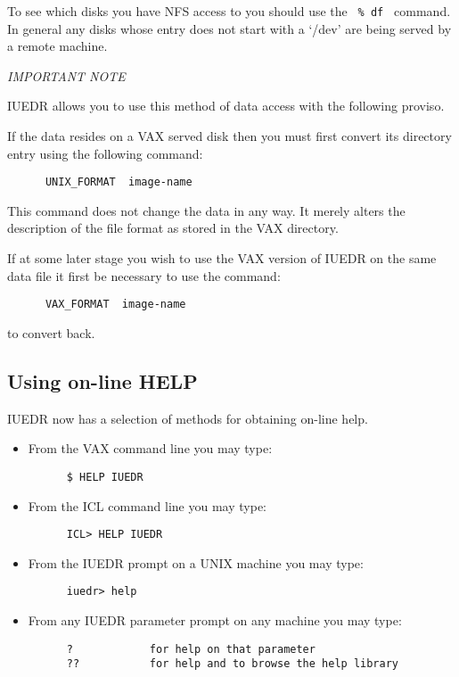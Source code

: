 To see which disks you have NFS access to you should use the {\tt
\%~df } command. In general any disks whose entry does not start with
a `/dev' are being served by a remote machine.


{\em IMPORTANT NOTE}

IUEDR allows you to use this method of data access with the following
proviso.

If the data resides on a VAX served disk then you must first  convert
its directory entry using the following command:

\begin{verbatim}
      UNIX_FORMAT  image-name
\end{verbatim}

This command does not change the data in any way. It merely alters the
description of the file format as stored in the VAX directory.

If at some later stage you wish to use the VAX version of IUEDR on the
same data file it first be necessary to use the command:

\begin{verbatim}
      VAX_FORMAT  image-name
\end{verbatim}

to convert back.
	
\subsection{Using on-line HELP}

IUEDR now has a selection of methods for obtaining on-line help.

\begin{itemize}
\item
From the VAX command line you may type:

\begin{verbatim}
      $ HELP IUEDR
\end{verbatim}
\item
From the ICL command line you may type:

\begin{verbatim}
      ICL> HELP IUEDR
\end{verbatim}

\item
From the IUEDR prompt on a UNIX machine you may type:

\begin{verbatim}
      iuedr> help
\end{verbatim}

\item
From any IUEDR parameter prompt on any machine you may type:

\begin{verbatim}
      ?            for help on that parameter
      ??           for help and to browse the help library
\end{verbatim}

\end{itemize}

